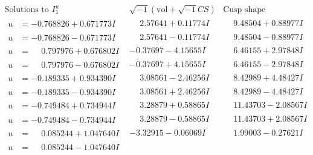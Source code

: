 \documentclass[1p]{elsarticle_modified}
\theoremstyle{definition}
\newcommand{\I}{\sqrt{-1}}
\begin{document}
$$\begin{array}{c|c|c}  
\text{Solutions to }I^u_{1}& \I (\text{vol} + \sqrt{-1}CS) & \text{Cusp shape}\\
 \hline 
\begin{aligned}
u &= -0.768826 + 0.671773 I\end{aligned}
 & \phantom{-}2.57641 + 0.11774 I & \phantom{-}9.48504 + 0.88977 I \\ \hline\begin{aligned}
u &= -0.768826 - 0.671773 I\end{aligned}
 & \phantom{-}2.57641 - 0.11774 I & \phantom{-}9.48504 - 0.88977 I \\ \hline\begin{aligned}
u &= \phantom{-}0.797976 + 0.676802 I\end{aligned}
 & -0.37697 - 4.15655 I & \phantom{-}6.46155 + 2.97848 I \\ \hline\begin{aligned}
u &= \phantom{-}0.797976 - 0.676802 I\end{aligned}
 & -0.37697 + 4.15655 I & \phantom{-}6.46155 - 2.97848 I \\ \hline\begin{aligned}
u &= -0.189335 + 0.934390 I\end{aligned}
 & \phantom{-}3.08561 - 2.46256 I & \phantom{-}8.42989 + 4.48427 I \\ \hline\begin{aligned}
u &= -0.189335 - 0.934390 I\end{aligned}
 & \phantom{-}3.08561 + 2.46256 I & \phantom{-}8.42989 - 4.48427 I \\ \hline\begin{aligned}
u &= -0.749484 + 0.734944 I\end{aligned}
 & \phantom{-}3.28879 + 0.58865 I & \phantom{-}11.43703 - 2.08567 I \\ \hline\begin{aligned}
u &= -0.749484 - 0.734944 I\end{aligned}
 & \phantom{-}3.28879 - 0.58865 I & \phantom{-}11.43703 + 2.08567 I \\ \hline\begin{aligned}
u &= \phantom{-}0.085244 + 1.047640 I\end{aligned}
 & -3.32915 - 0.06069 I & \phantom{-}1.99003 - 0.27621 I \\ \hline\begin{aligned}
u &= \phantom{-}0.085244 - 1.047640 I\end{aligned}

\end{array}$$
\end{document}

